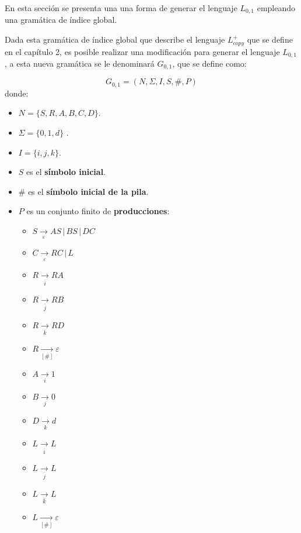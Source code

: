 \documentclass[12pt]{article}
\begin{document}
En esta sección se presenta una una forma de generar el lenguaje $L_{0,1}$ empleando una gramática de índice global.

Dada esta gramática de índice global que describe el lenguaje $L_{copy}^+$ que se define en el capítulo 2, es posible realizar una modificación para generar el lenguaje
$L_{0,1}$, a esta nueva gramática se le denominará $G_{0,1}$, que se define como:

$$
    G_{0,1} = (N, \Sigma, I, S, \#, P) 
$$
donde:

\begin{itemize}
    \item $N= \{S,R,A,B,C,D\}$.
    \item \( \Sigma=\{0,1,d\} \) .
    \item $I=\{i,j,k\}$.
    \item $S$ es el \textbf{símbolo inicial}.
    \item $\#$ es el \textbf{símbolo inicial de la pila}.
    \item $P$ es un conjunto finito de \textbf{producciones}:
          \begin{multicols}{2}
              \begin{itemize}
                  \item $S\underset{\varepsilon}{\to} AS\,|\,BS\,|\,DC$
                  \item $C\underset{\varepsilon}{\to} RC\,|\,L$
                  \item $R\underset{\overline{i}}{\to} RA$
                  \item $R\underset{\overline{j}}{\to} RB$
                  \item $R\underset{\overline{k}}{\to} RD$
                        
                  \item $R\underset{[\#]}{\to} \varepsilon$
                  \item $A\underset{i}{\to} 1$
                  \item $B\underset{j}{\to} 0$
                  \item $D\underset{k}{\to} d$
                  \item $L\underset{\overline{i}}{\to} L$
                  \item $L\underset{\overline{j}}{\to} L$
                  \item $L\underset{\overline{k}}{\to} L$
                  \item $L\underset{[\#]}{\to} \varepsilon$
              \end{itemize}
          \end{multicols}
\end{itemize}
\end{document}
